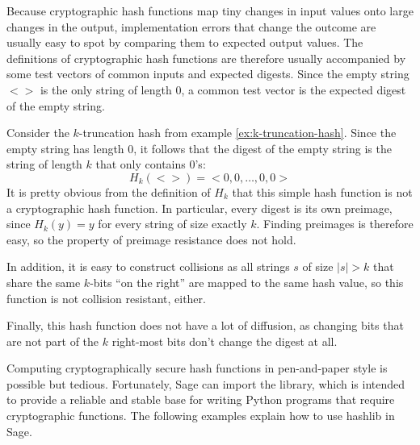 Because cryptographic hash functions map tiny changes in input values onto large changes in the output, implementation errors that change the outcome are usually easy to spot by comparing them to expected output values. The definitions of cryptographic hash functions are therefore usually accompanied by some test vectors of common inputs and expected digests. Since the empty string $<>$ is the only string of length $0$, a common test vector is the expected digest of the empty string.
\begin{example} Consider the $k$-truncation hash from example \ref{ex:k-truncation-hash}. Since the empty string has length $0$, it follows that the digest of the empty string is the string of length $k$ that only contains $0$'s:
\begin{equation}
H_k(<>)= <0,0,\ldots, 0,0>
\end{equation}
It is pretty obvious from the definition of $H_k$ that this simple hash function is not a cryptographic hash function. In particular, every digest is its own preimage, since $H_k(y)=y$ for every string of size exactly $k$. Finding preimages is therefore easy, so the property of preimage resistance does not hold.

In addition, it is easy to construct collisions as all strings $s$ of size $|s|>k$ that share the same $k$-bits ``on the right'' are mapped to the same hash value, so this function is not collision resistant, either.

Finally, this hash function does not have a lot of diffusion, as changing bits that are not part of the $k$ right-most bits don't change the digest at all.
\end{example}
Computing cryptographically secure hash functions in pen-and-paper style is possible but tedious. Fortunately, Sage can import the  library, which is intended to provide a reliable and stable base for writing Python programs that require cryptographic functions. The following examples explain how to use hashlib in Sage.
